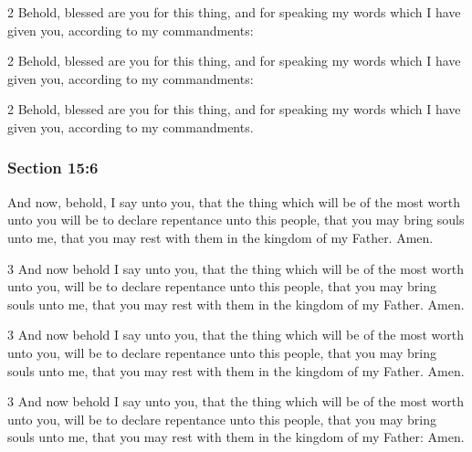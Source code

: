 		\begin{framed}
		\scriptsize
			\begin{compactdesc}
				\item[JSP] 2 Behold, blessed are you for this thing, and for speaking my words which I have given you, according to my commandments:
				\item[DC 1835] 2 Behold, blessed are you for this thing, and for speaking my words which I have given you, according to my commandments:
				\item[DC 1844] 2 Behold, blessed are you for this thing, and for speaking my words which I have given you, according to my commandments.
			\end{compactdesc}
		\end{framed}

	\subsubsection{Section 15:6} %
		\label{DC15-6}

		And now, behold, I say unto you, that the thing which will be of the most worth unto you will be to declare repentance unto this people, that you may bring souls unto me, that you may rest with them in the kingdom of my Father. Amen.

		\begin{framed}
		\scriptsize
			\begin{compactdesc}
				\item[JSP] 3 And now behold I say unto you, that the thing which will be of the most worth unto you, will be to declare repentance unto this people, that you may bring souls unto me, that you may rest with them in the kingdom of my Father. Amen.
				\item[DC 1835] 3 And now behold I say unto you, that the thing which will be of the most worth unto you, will be to declare repentance unto this people, that you may bring souls unto me, that you may rest with them in the kingdom of my Father. Amen.
				\item[DC 1844] 3 And now behold I say unto you, that the thing which will be of the most worth unto you, will be to declare repentance unto this people, that you may bring souls unto me, that you may rest with them in the kingdom of my Father: Amen.
			\end{compactdesc}
		\end{framed}